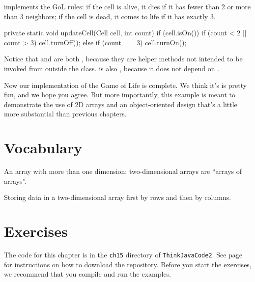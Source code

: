  implements the GoL rules: if the cell is alive, it dies if it has fewer than 2 or more than 3 neighbors; if the cell is dead, it comes to life if it has exactly 3.

\begin{code}
private static void updateCell(Cell cell, int count) {
    if (cell.isOn()) {
        if (count < 2 || count > 3) {
            cell.turnOff();
        }
    } else {
        if (count == 3) {
            cell.turnOn();
        }
    }
}
\end{code}

Notice that  and  are both , because they are helper methods not intended to be invoked from outside the class.
 is also , because it does not depend on .

Now our implementation of the Game of Life is complete.
We think it's is pretty fun, and we hope you agree.
But more importantly, this example is meant to demonstrate the use of 2D arrays and an object-oriented design that's a little more substantial than previous chapters.



\section{Vocabulary}

\begin{description}

An array with more than one dimension; two-dimensional arrays are ``arrays of arrays''.

Storing data in a two-dimensional array first by rows and then by columns.

\end{description}


\section{Exercises}

The code for this chapter is in the {\tt ch15} directory of {\tt ThinkJavaCode2}.
See page~\pageref{code} for instructions on how to download the repository.
Before you start the exercises, we recommend that you compile and run the examples.


